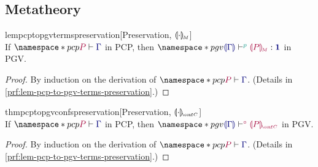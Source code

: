 \documentclass[main.tex]{subfiles}
\begin{document}
\subsection{Metatheory}

\begin{restatablelemma}{lempcptopgvtermspreservation}[Preservation, $\llparenthesis\cdot\rrparenthesis_{\!\scriptscriptstyle{M}}$]
  \label{lem:pcp-to-pgv-terms-preservation}
  \hfill\\%
  If $\pcp{\seq{P}{\ty{\Gamma}}}$ in PCP,
  then $\pgv{\tseq[\cs{p}]{\ty{\cpgvT{\Gamma}}}{\cpgvM{P}}{\tyunit}}$ in PGV.
\end{restatablelemma}
\begin{proof}
  By induction on the derivation of $\pcp{\seq{P}{\ty{\Gamma}}}$.
  (Details in \cref{prf:lem-pcp-to-pgv-terms-preservation}.)
\end{proof}

\begin{restatabletheorem}{thmpcptopgvconfspreservation}[Preservation, $\cpgvC{\cdot}$]
  \label{thm:pcp-to-pgv-confs-preservation}
  \hfill\\%
  If $\pcp{\seq{P}{\ty{\Gamma}}}$ in PCP,
  then $\pgv{\cseq[\child]{\ty{\cpgvT{\Gamma}}}{\cpgvC{P}}}$ in PGV.
\end{restatabletheorem}
\begin{proof}
  By induction on the derivation of $\pcp{\seq{P}{\ty{\Gamma}}}$.
  (Details in \cref{prf:lem-pcp-to-pgv-terms-preservation}.)
\end{proof}
\end{document}
